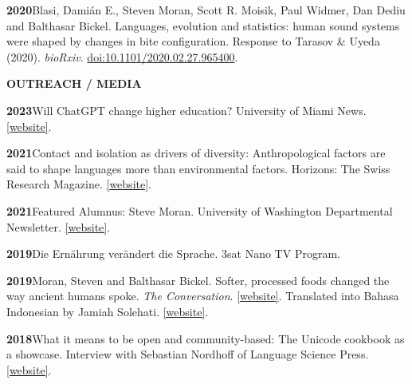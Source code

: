 \documentclass[11pt]{article}
\newcommand{\hangpara}{
 \setlength{\parindent}{0in} %
 \hangindent=0.42in %
}
\begin{document}
\vskip 6pt
\hangpara
{\bf 2020}\hspace{1ex}Blasi, Damián E., Steven Moran, Scott R. Moisik, Paul Widmer, Dan Dediu and Balthasar Bickel. Languages, evolution and statistics: human sound systems were shaped by changes in bite configuration. Response to Tarasov \& Uyeda (2020). \textit{bioRxiv}. \href{https://doi.org/10.1101/2020.02.27.965400}{doi:10.1101/2020.02.27.965400}.

\vskip 20pt
\begin{flushleft}
{\bf OUTREACH / MEDIA}
\end{flushleft}


\hangpara
{\bf 2023}\hspace{1ex}Will ChatGPT change higher education? University of Miami News. \href{https://news.miami.edu/as/stories/2023/04/will-chatgpt-change-higher-education.html}{[website]}.

\hangpara
\vskip 6pt
{\bf 2021}\hspace{1ex}Contact and isolation as drivers of diversity: Anthropological factors are said to shape languages more than environmental factors. Horizons: The Swiss Research Magazine. \href{https://www.horizons-mag.ch/2021/06/03/contact-and-isolation-as-drivers-of-language-diversity/}{[website]}.

\hangpara
\vskip 6pt
{\bf 2021}\hspace{1ex}Featured Alumnus: Steve Moran. University of Washington Departmental Newsletter. \href{https://linguistics.washington.edu/news/2021/02/19/featured-alumnus-steve-moran}{[website]}.

\hangpara
\vskip 6pt
{\bf 2019}\hspace{1ex}Die Ernährung verändert die Sprache. 3sat Nano TV Program. 

\hangpara
\vskip 6pt
{\bf 2019}\hspace{1ex}Moran, Steven and Balthasar Bickel. Softer, processed foods changed the way ancient humans spoke. \textit{The Conversation}. \href{https://theconversation.com/softer-processed-foods-changed-the-way-ancient-humans-spoke-113599}{[website]}. Translated into Bahasa Indonesian by Jamiah Solehati. \href{https://theconversation.com/makanan-olahan-yang-lebih-lembut-ubah-cara-manusia-purba-berbicara-115509}{[website]}.

\hangpara
\vskip 6pt {\bf 2018}\hspace{1ex}What it means to be open and community-based: The Unicode cookbook as a showcase. Interview with Sebastian Nordhoff of Language Science Press. \href{https://userblogs.fu-berlin.de/langsci-press/2018/07/11/what-it-means-to-be-open-and-community-based-the-unicode-cookbook-as-a-showcase/}{[website]}.
\end{document}
